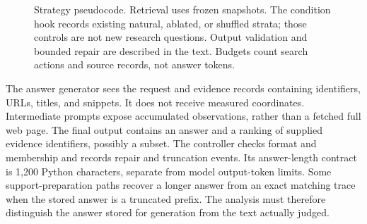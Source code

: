 \begin{figure}[t]
\small
{}
\caption{Strategy pseudocode. Retrieval uses frozen snapshots. The condition hook records existing natural, ablated, or shuffled strata; those controls are not new research questions. Output validation and bounded repair are described in the text. Budgets count search actions and source records, not answer tokens.}
\label{fig:pseudocode}
\end{figure}

The answer generator sees the request and evidence records containing identifiers, URLs, titles, and snippets. It does not receive measured coordinates. Intermediate prompts expose accumulated observations, rather than a fetched full web page. The final output contains an answer and a ranking of supplied evidence identifiers, possibly a subset. The controller checks format and membership and records repair and truncation events. Its answer-length contract is 1,200 Python characters, separate from model output-token limits. Some support-preparation paths recover a longer answer from an exact matching trace when the stored answer is a truncated prefix. The analysis must therefore distinguish the answer stored for generation from the text actually judged. 

